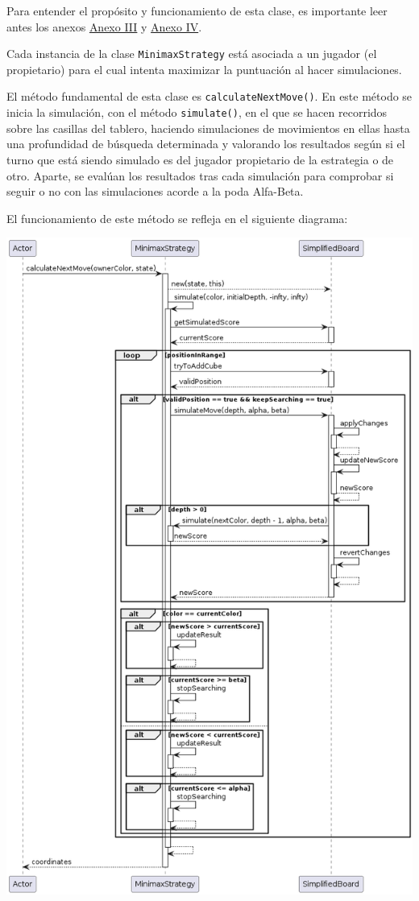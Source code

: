 \documentclass[12pt,a4paper,openright]{book}
\theoremstyle{break}
\begin{document}
\label{subsubsec:MinimaxStrategy}
Para entender el propósito y funcionamiento de esta clase, es importante leer antes los anexos \hyperref[ch:AnexoIII]{Anexo III} y \hyperref[ch:AnexoIV]{Anexo IV}.

Cada instancia de la clase \texttt{MinimaxStrategy} está asociada a un jugador (el propietario) para el cual intenta maximizar la puntuación al hacer simulaciones.

El método fundamental de esta clase es \texttt{calculateNextMove()}. En este método se inicia la simulación, con el método \texttt{simulate()}, en el que se hacen recorridos sobre las casillas del tablero, haciendo simulaciones de movimientos en ellas hasta una profundidad de búsqueda determinada y valorando los resultados según si el turno que está siendo simulado es del jugador propietario de la estrategia o de otro. Aparte, se evalúan los resultados tras cada simulación para comprobar si seguir o no con las simulaciones acorde a la poda Alfa-Beta.

El funcionamiento de este método se refleja en el siguiente diagrama:

\begin{center}
\includegraphics[scale=0.5]{MinimaxStrategy.calculateNextMove()-sprint6.png} 
\end{center}
\end{document}
